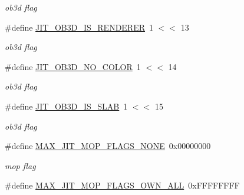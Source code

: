 \begin{DoxyCompactItemize}
\begin{DoxyCompactList}\small\item\em ob3d flag \item\end{DoxyCompactList}\item 
\hypertarget{group__jitter_ga46c7216fed49a3b9f9f10ad4d87cea55}{
\#define \hyperlink{group__jitter_ga46c7216fed49a3b9f9f10ad4d87cea55}{JIT\_\-OB3D\_\-IS\_\-RENDERER}~1 $<$$<$ 13}
\label{group__jitter_ga46c7216fed49a3b9f9f10ad4d87cea55}

\begin{DoxyCompactList}\small\item\em ob3d flag \item\end{DoxyCompactList}\item 
\hypertarget{group__jitter_ga6d6e4c119dbea5119a0f452a2486e590}{
\#define \hyperlink{group__jitter_ga6d6e4c119dbea5119a0f452a2486e590}{JIT\_\-OB3D\_\-NO\_\-COLOR}~1 $<$$<$ 14}
\label{group__jitter_ga6d6e4c119dbea5119a0f452a2486e590}

\begin{DoxyCompactList}\small\item\em ob3d flag \item\end{DoxyCompactList}\item 
\hypertarget{group__jitter_gaf6797493caebaf2a151563492f190b35}{
\#define \hyperlink{group__jitter_gaf6797493caebaf2a151563492f190b35}{JIT\_\-OB3D\_\-IS\_\-SLAB}~1 $<$$<$ 15}
\label{group__jitter_gaf6797493caebaf2a151563492f190b35}

\begin{DoxyCompactList}\small\item\em ob3d flag \item\end{DoxyCompactList}\item 
\hypertarget{group__jitter_ga6f8627ede2fc37736591b2d8f8e32b5b}{
\#define \hyperlink{group__jitter_ga6f8627ede2fc37736591b2d8f8e32b5b}{MAX\_\-JIT\_\-MOP\_\-FLAGS\_\-NONE}~0x00000000}
\label{group__jitter_ga6f8627ede2fc37736591b2d8f8e32b5b}

\begin{DoxyCompactList}\small\item\em mop flag \item\end{DoxyCompactList}\item 
\hypertarget{group__jitter_ga60cbfeaf26417a8d6561fb9acce523d5}{
\#define \hyperlink{group__jitter_ga60cbfeaf26417a8d6561fb9acce523d5}{MAX\_\-JIT\_\-MOP\_\-FLAGS\_\-OWN\_\-ALL}~0xFFFFFFFF}
\label{group__jitter_ga60cbfeaf26417a8d6561fb9acce523d5}


\end{DoxyCompactItemize}

